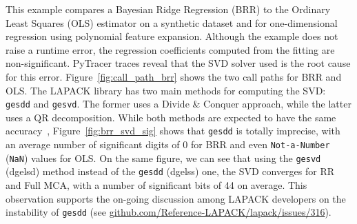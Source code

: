 \documentclass[11pt]{article}
\newcommand{\tristan}[1]{\color{orange}\textbf{From Tristan:} #1\color{black}\xspace}
\newcommand{\pytracer}[0]{PyTracer\xspace}
\begin{document}
This example compares a Bayesian Ridge Regression (BRR) to the Ordinary Least Squares (OLS) estimator on a synthetic dataset and for one-dimensional regression using polynomial feature expansion. Although the example does not raise a runtime error, the regression coefficients computed from the fitting are 
non-significant. \pytracer traces reveal that the SVD solver used is the root cause for this error. 
Figure~\ref{fig:call_path_brr} shows the two call paths for BRR and OLS. 
The LAPACK library has two main methods for computing the SVD: \texttt{gesdd} and \texttt{gesvd}.
The former uses a Divide \& Conquer approach, while the latter uses a QR decomposition. 
While both methods are expected to have the same accuracy~\cite{nakatsukasa2013stable}, Figure~\ref{fig:brr_svd_sig} shows that \texttt{gesdd} is totally imprecise, with an average number of significant digits of 0 for BRR and even \texttt{Not-a-Number} (\texttt{NaN}) values for OLS. 
On the same figure, we can see that 
using the \texttt{gesvd} (dgelsd) method instead of the \texttt{gesdd} (dgelss) one, 
the SVD converges for RR and Full MCA, with a number of significant bits of 44 on average. 
This observation supports the on-going discussion among LAPACK developers on the instability of \texttt{gesdd} (see  \href{https://github.com/Reference-LAPACK/lapack/issues/316}{github.com/Reference-LAPACK/lapack/issues/316}). 

\end{document}
